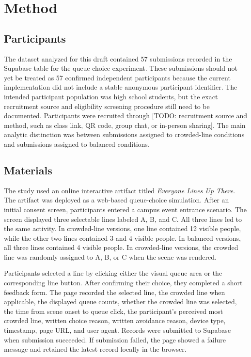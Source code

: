 \documentclass[stu,12pt,floatsintext]{apa7}
\begin{document}
\section{Method}

\subsection{Participants}

The dataset analyzed for this draft contained 57 submissions recorded in the Supabase table for the queue-choice experiment. These submissions should not yet be treated as 57 confirmed independent participants because the current implementation did not include a stable anonymous participant identifier. The intended participant population was high school students, but the exact recruitment source and eligibility screening procedure still need to be documented. Participants were recruited through [TODO: recruitment source and method, such as class link, QR code, group chat, or in-person sharing]. The main analytic distinction was between submissions assigned to crowded-line conditions and submissions assigned to balanced conditions.

\subsection{Materials}

The study used an online interactive artifact titled \textit{Everyone Lines Up There}. The artifact was deployed as a web-based queue-choice simulation. After an initial consent screen, participants entered a campus event entrance scenario. The screen displayed three selectable lines labeled A, B, and C. All three lines led to the same activity. In crowded-line versions, one line contained 12 visible people, while the other two lines contained 3 and 4 visible people. In balanced versions, all three lines contained 4 visible people. In crowded-line versions, the crowded line was randomly assigned to A, B, or C when the scene was rendered.

Participants selected a line by clicking either the visual queue area or the corresponding line button. After confirming their choice, they completed a short feedback form. The page recorded the selected line, the crowded line when applicable, the displayed queue counts, whether the crowded line was selected, the time from scene onset to queue click, the participant's perceived most crowded line, written choice reason, written avoidance reason, device type, timestamp, page URL, and user agent. Records were submitted to Supabase when submission succeeded. If submission failed, the page showed a failure message and retained the latest record locally in the browser.
\end{document}

